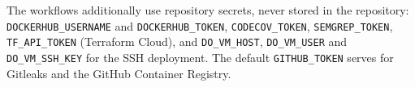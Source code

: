 The workflows additionally use repository secrets, never stored in the repository: \texttt{DOCKERHUB\_\allowbreak USERNAME} and \texttt{DOCKERHUB\_\allowbreak TOKEN}, \texttt{CODECOV\_\allowbreak TOKEN}, \texttt{SEMGREP\_\allowbreak TOKEN}, \texttt{TF\_\allowbreak API\_\allowbreak TOKEN} (Terraform Cloud), and \texttt{DO\_\allowbreak VM\_\allowbreak HOST}, \texttt{DO\_\allowbreak VM\_\allowbreak USER} and \texttt{DO\_\allowbreak VM\_\allowbreak SSH\_\allowbreak KEY} for the SSH deployment. The default \texttt{GITHUB\_\allowbreak TOKEN} serves for Gitleaks and the GitHub Container Registry.
